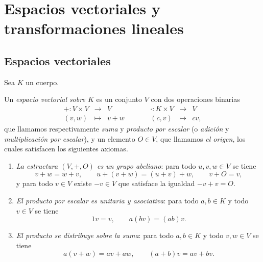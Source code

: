 \chapter{Espacios vectoriales y transformaciones lineales}

\section{Espacios vectoriales}

Sea $K$ un cuerpo.

\begin{defn}\label{defespvec}
Un \emph{espacio vectorial sobre $K$} es un conjunto $V$ con dos operaciones binarias
\[
\begin{array}{rclcrcl}
+:V\times V & \longrightarrow & V &\qquad& \cdot: K\times V & \longrightarrow & V \\
(v,w) & \longmapsto & v+w &\qquad& (c,v) & \longmapsto & cv, 
\end{array}
\]
que llamamos respectivamente \emph{suma} y \emph{producto por escalar} (o \emph{adici\'on} y \emph{multiplicaci\'on por escalar}), y un elemento $O\in V$, que llamamos \emph{el origen}, los cuales satisfacen los siguientes axiomas.
\begin{enumerate}
\item \emph{La estructura $(V,+,O)$ es un grupo abeliano}: para todo $u,v,w\in V$ se tiene
\[ v+w=w+v,\qquad u+(v+w)=(u+v)+w,\qquad v+O=v,\]
y para todo $v\in V$ existe $-v\in V$ que satisface la igualdad $-v+v=O$.
\item \emph{El producto por escalar es unitaria y asociativa}: para todo $a,b\in K$ y todo $v\in V$ se tiene
\[ 1v=v,\qquad a(bv)=(ab)v.\]
\item \emph{El producto se distribuye sobre la suma}: para todo $a,b\in K$ y todo $v,w\in V$ se tiene
\[ a(v+w)=av+aw,\qquad (a+b)v=av+bv.\] 
\end{enumerate}
\end{defn}

